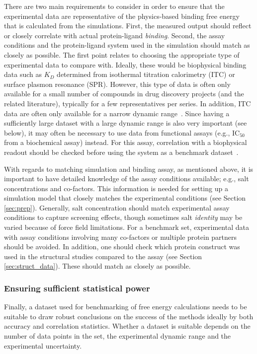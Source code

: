 \documentclass[9pt,bestpractices]{livecoms}
\begin{document}
There are two main requirements to consider in order to ensure that the experimental data are representative of the physics-based binding free energy that is calculated from the simulations. First, the measured output should reflect or closely correlate with actual protein-ligand \emph{binding}. Second, the assay conditions and the protein-ligand system used in the simulation should match as closely as possible. The first point relates to choosing the appropriate type of experimental data to compare with. Ideally, these would be biophysical binding data such as $K_D$ determined from isothermal titration calorimetry (ITC) or surface plasmon resonance (SPR). However, this type of data is often only available for a small number of compounds in drug discovery projects (and the related literature), typically for a few representatives per series. In addition, ITC data are often only available for a narrow dynamic range~\cite{wiseman_rapid_1989,chodera_entropyenthalpy_2013}. Since having a sufficiently large dataset with a large dynamic range is also very important (see below), it may often be necessary to use data from functional assays (e.g., IC$_{50}$ from a biochemical assay) instead. For this assay, correlation with a biophysical readout should be checked before using the system as a benchmark dataset~\cite{kalliokoski_comparability_2013}.

With regards to matching simulation and binding assay, as mentioned above, it is important to have detailed knowledge of the assay conditions available; e.g., salt concentrations and co-factors. This information is needed for setting up a simulation model that closely matches the experimental conditions (see Section \ref{sec:prep}). Generally, salt concentration should match experimental assay conditions to capture screening effects, though sometimes salt \emph{identity} may be varied because of force field limitations. For a benchmark set, experimental data with assay conditions involving many co-factors or multiple protein partners should be avoided. In addition, one should check which protein construct was used in the structural studies compared to the assay (see Section \ref{sec:struct_data}). These should match as closely as possible. 

\subsubsection{Ensuring sufficient statistical power}
Finally, a dataset used for benchmarking of free energy calculations needs to be suitable to draw robust conclusions on the success of the methods ideally by both accuracy and correlation statistics. Whether a dataset is suitable depends on the number of data points in the set, the experimental dynamic range and the experimental uncertainty. 
\end{document}
